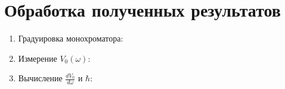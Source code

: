 \documentclass[12pt,a4paper]{article}
\begin{document}
\section{Обработка полученных результатов}

\begin{enumerate}
\item Градуировка монохроматора:

\begin{figure}[h]
\end{figure}

\newpage

\item Измерение $V_0( \omega)$:

\begin{figure}[h]
\end{figure}

\item Вычисление $\frac{dV_0}{d\omega}$ и $\hbar$:


\end{enumerate}
\end{document}
